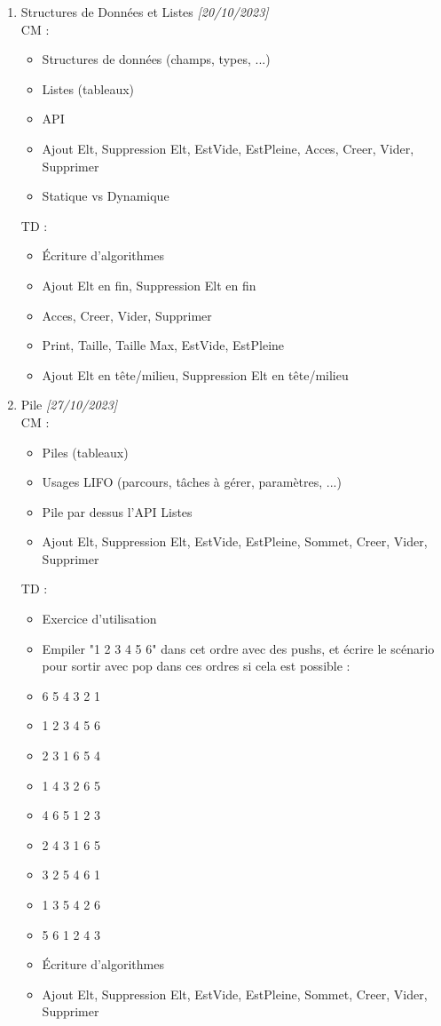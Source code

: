 \documentclass[11pt,a4paper]{article}
\begin{document}
\begin{enumerate}
\medskip

\item Structures de Données et Listes \textit{[20/10/2023]}\\
  CM :
  \begin{itemize}
  \item Structures de données (champs, types, ...)
  \item Listes (tableaux)
  \item API
  \item Ajout Elt, Suppression Elt, EstVide, EstPleine, Acces, Creer, Vider, Supprimer
  \item Statique vs Dynamique
  \end{itemize}
  TD :
  \begin{itemize}
  \item \'Ecriture d'algorithmes
  \item Ajout Elt en fin, Suppression Elt en fin
  \item Acces, Creer, Vider, Supprimer
  \item Print, Taille, Taille Max, EstVide, EstPleine
  \item Ajout Elt en tête/milieu, Suppression Elt en tête/milieu
  \end{itemize}

\medskip

\clearpage

\item Pile \textit{[27/10/2023]}\\
  CM :
  \begin{itemize}
  \item Piles (tableaux)
  \item Usages LIFO (parcours, tâches à gérer, paramètres, ...)
  \item Pile par dessus l'API Listes
  \item Ajout Elt, Suppression Elt, EstVide, EstPleine, Sommet, Creer, Vider, Supprimer
  \end{itemize}
  TD :
  \begin{itemize}
  \item Exercice d'utilisation
  \item Empiler "1 2 3 4 5 6" dans cet ordre avec des pushs, et écrire le scénario pour sortir avec pop dans ces ordres si cela est possible :\\
  \item 6 5 4 3 2 1
  \item 1 2 3 4 5 6
  \item 2 3 1 6 5 4
  \item 1 4 3 2 6 5
  \item 4 6 5 1 2 3  %
  \item 2 4 3 1 6 5
  \item 3 2 5 4 6 1
  \item 1 3 5 4 2 6
  \item 5 6 1 2 4 3  %
  \item \'Ecriture d'algorithmes
  \item Ajout Elt, Suppression Elt, EstVide, EstPleine, Sommet, Creer, Vider, Supprimer
  \end{itemize}


\end{enumerate}
\end{document}
